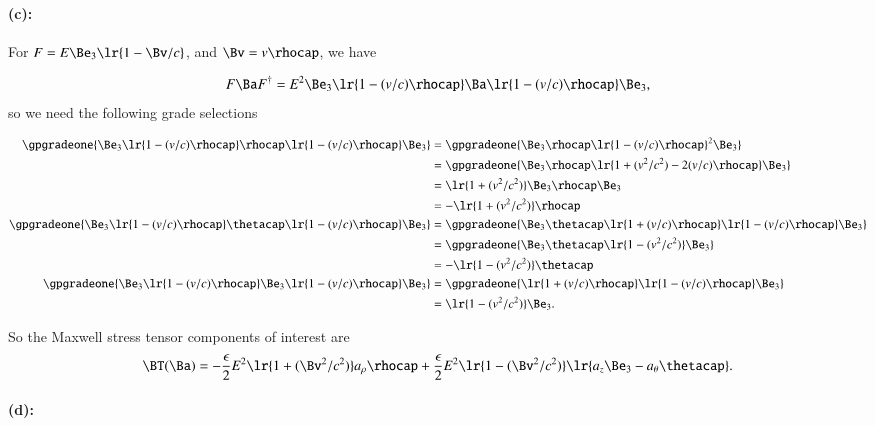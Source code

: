 \paragraph{(c):}

For \( F = E \Be_3 \lr{ 1 - \Bv/c } \), and \( \Bv = v \rhocap \), we have

\begin{dmath}\label{eqn:poyntingStaticExamples:1220}
F \Ba F^\dagger
=
E^2 \Be_3 \lr{ 1 - (v/c) \rhocap } \Ba \lr{ 1 - (v/c) \rhocap } \Be_3,
\end{dmath}
so we need the following grade selections

\begin{equation}\label{eqn:poyntingStaticExamples:1260}
\begin{aligned}
\gpgradeone{ \Be_3 \lr{ 1 - (v/c) \rhocap } \rhocap \lr{ 1 - (v/c) \rhocap } \Be_3 }
&=
\gpgradeone{ \Be_3 \rhocap \lr{ 1 - (v/c) \rhocap }^2 \Be_3 } \\
&=
\gpgradeone{ \Be_3 \rhocap \lr{ 1 + (v^2/c^2) - 2 (v/c) \rhocap } \Be_3 } \\
&=
\lr{ 1 + (v^2/c^2) } \Be_3 \rhocap \Be_3 \\
&=
-\lr{ 1 + (v^2/c^2) } \rhocap \\
\gpgradeone{ \Be_3 \lr{ 1 - (v/c) \rhocap } \thetacap \lr{ 1 - (v/c) \rhocap } \Be_3 }
&=
\gpgradeone{ \Be_3 \thetacap \lr{ 1 + (v/c) \rhocap } \lr{ 1 - (v/c) \rhocap } \Be_3 } \\
&=
\gpgradeone{ \Be_3 \thetacap \lr{ 1 - (v^2/c^2) } \Be_3 } \\
&=
-\lr{ 1 - (v^2/c^2) } \thetacap \\
\gpgradeone{ \Be_3 \lr{ 1 - (v/c) \rhocap } \Be_3 \lr{ 1 - (v/c) \rhocap } \Be_3 }
&=
\gpgradeone{ \lr{ 1 + (v/c) \rhocap } \lr{ 1 - (v/c) \rhocap } \Be_3 } \\
&=
\lr{ 1 - (v^2/c^2) } \Be_3.
\end{aligned}
\end{equation}

So the Maxwell stress tensor components of interest are
\begin{dmath}\label{eqn:poyntingStaticExamples:1320}
\BT(\Ba)
=
-\frac{\epsilon}{2} E^2 \lr{ 1 + (\Bv^2/c^2) } a_\rho \rhocap
+
\frac{\epsilon}{2} E^2 \lr{ 1 - (\Bv^2/c^2) } \lr{ a_z \Be_3 - a_\theta \thetacap }.
\end{dmath}

\paragraph{(d):}

